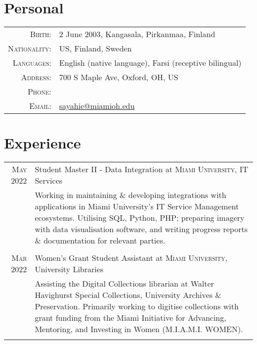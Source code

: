\documentclass[a4paper,10pt]{article} %
\begin{document}
\pagestyle{empty} %


\par{\bigskip\par} %

\section{Personal}

\begin{tabular}{rl}
\textsc{Birth:} & 2 June 2003, Kangasala, Pirkanmaa, Finland \\
\textsc{Nationality:} & US, Finland, Sweden \\
\textsc{Languages:} & English (native language), Farsi (receptive bilingual)\\
\textsc{Address:} & 700 S Maple Ave, Oxford, OH, US \\
\textsc{Phone:} & \href{tel:+1-513-484-0972}{\color{black}{+1 (513) 484-0972}}\\
\textsc{Email:} & \href{mailto:sayahie@miamioh.edu}{sayahie@miamioh.edu}\\
\end{tabular}


\section{Experience}

\begin{tabular}{r|p{11cm}}
\textsc{May 2022} & Student Master II - Data Integration at \textsc{Miami University}, IT Services \emph{}\\
& \footnotesize{Working in maintaining \& developing integrations with applications in Miami University's IT Service Management ecosystems.
Utilising SQL, Python, PHP; preparing imagery with data visualisation software, and writing progress reports \& documentation for relevant parties.}\\
\multicolumn{2}{c}{} \\


\textsc{Mar 2022} & Women's Grant Student Assistant at \textsc{Miami University}, University Libraries \emph{}\\
& \footnotesize{Assisting the Digital Collections librarian at Walter Havighurst Special Collections, University Archives \& Preservation.
Primarily working to digitise collections with grant funding from the Miami Initiative for Advancing, Mentoring, and Investing in Women (M.I.A.M.I. WOMEN).}\\
\multicolumn{2}{c}{} \\
\end{tabular}
\end{document}
